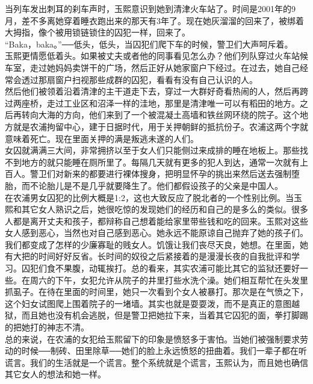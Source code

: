 当列车发出刺耳的刹车声时，玉熙意识到她到清津火车站了。时间是2001年的9月，差不多离她穿着睡衣跑出来的那天有3年了。现在她灰溜溜的回来了，被绑着大拇指，像个被用锁链锁住的囚犯一样，回来了。\\

“Baka，baka。”──低头，低头，当囚犯们爬下车的时候，警卫们大声呵斥着。\\

玉熙更情愿低着头。如果被丈夫或者他的同事看见怎么办？他们列队穿过火车站候车室，走过她妈妈卖饼干的广场，然后正好从她家窗户下经过。在过去，她自己经常会透过那扇窗户扫视那些成群的囚犯，看看有没有自己认识的人。\\

然后他们被领着沿着清津的主干道走下去，穿过一大群好奇看热闹的人，然后再跨过两座桥，走过工业区和沼泽一样的洼地，那里是清津唯一可以有稻田的地方。之后再转向大海的方向，他们来到了一个被混凝土高墙和铁丝网环绕的院子。这个地方就是农浦拘留中心，建于日据时代，用于关押朝鲜的抵抗份子。农浦这两个字就意味着死亡。现在里面关押的满是叛逃未遂的人们。\\

女囚就满满三大间，非常拥挤以至于女人们只能侧过来成排的睡在地板上。那些找不到地方的就只能睡在厕所里了。每隔几天就有更多的犯人到达，通常一次就有上百人。警卫们对新来的都要进行裸体搜身，把明显怀孕的挑出来然后送去强制堕胎，而不论胎儿是不是几乎就要降生了。他们都假设孩子的父亲是中国人。\\

在农浦男女囚犯的比例大概是1:2，这也大致反应了脱北者的一个性别比例。当玉熙和其它女人熟识之后，她很吃惊的发现她们的经历和自己的是多么的类似。很多人都是离开丈夫和孩子，都辩称自己想着能给家里带些钱和吃的回来。玉熙对这些女人感到恶心，当然也对自己感到恶心。她永远不能原谅自己抛弃了她的孩子们。我们都变成了怎样的少廉寡耻的贱女人。饥饿让我们丧尽天良，她想。在里面，她有大把的时间好好反省。长时间的奴役之后紧接着的是漫漫长夜的自我批评和学习。囚犯们食不果腹，动辄挨打。总的看来，其实农浦可能比其它的监狱还要好一些。在周六的下午，女犯允许从院子的井里打些水洗个澡。她们相互帮忙在头发里抓虱子。在待在里面的时间里，她只一次看到个女人被暴打。那次是在气愤之下，这个妇女试图爬上围着院子的一堵墙。其实也就是耍耍泼，而不是真正的意图越狱，而且她也没有机会逃脱，但是警卫把她拉下来，当着其它囚犯的面，拳打脚踢的把她打的神志不清。\\

总的来说，在农浦的女犯给玉熙留下的印象是愤怒多于害怕。当她们被强制要求劳动的时候──制砖、田里除草──她们的脸上永远愤怒的扭曲着。我们一辈子都在听谎言。我们的生活就是一个谎言。整个系统就是个谎言，玉熙认为，而且她也确信其它女人的想法和她一样。\\

